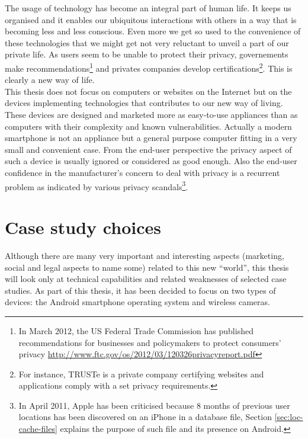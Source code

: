 The usage of technology has become an integral part of human life.
It keeps us organised and it enables our ubiquitous interactions with others in a way that is becoming less and less conscious.
Even more we get so used to the convenience of these technologies that we might get not very reluctant to unveil a part of our private life.
As users seem to be unable to protect their privacy, governements make recommendations\footnote{In March 2012, the US Federal Trade Commission has published recommendations for businesses and policymakers to protect consumers' privacy \url{http://www.ftc.gov/os/2012/03/120326privacyreport.pdf}} and privates companies develop certifications\footnote{For instance, TRUSTe is a private company certifying websites and applications comply with a set privacy requirements.}.
This is clearly a new way of life.\\

This thesis does not focus on computers or websites on the Internet but on the devices implementing technologies that contributes to our new way of living.
These devices are designed and marketed more as easy-to-use appliances than as computers with their complexity and known vulnerabilities.
Actually a modern smartphone is not an appliance but a general purpose computer fitting in a very small and convenient case.
From the end-user perspective the privacy aspect of such a device is usually ignored or considered as good enough.
Also the end-user confidence in the manufacturer’s concern to deal with privacy is a recurrent problem as indicated by various privacy scandals\footnote{In April 2011, Apple has been criticised because 8 months of previous user locations has been discovered on an iPhone in a database file, Section \ref{sec:loc-cache-files} explains the purpose of such file and its presence on Android.}.\\

\section*{Case study choices}

Although there are many very important and interesting aspects (marketing, social and legal aspects to name some) related to this new ``world'', this thesis will look only at technical capabilities and related weaknesses of selected case studies.
As part of this thesis, it has been decided to focus on two types of devices: the Android smartphone operating system and wireless cameras.\\

